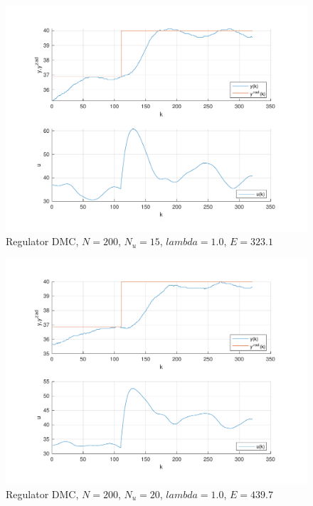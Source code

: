 \begin{figure}[H]
    \centering
    \includegraphics[scale=0.75]{../lab/zad_4/zad4dmc2.pdf}
    \caption{Regulator DMC, $N=\num{200}$, $N_{u}=\num{15}$, $lambda=\num{1.0}$, $E=\num{323.1}$}
\end{figure}

\begin{figure}[H]
    \centering
    \includegraphics[scale=0.75]{../lab/zad_4/zad4dmc3.pdf}
    \caption{Regulator DMC, $N=\num{200}$, $N_{u}=\num{20}$, $lambda=\num{1.0}$, $E=\num{439.7}$}
\end{figure}
